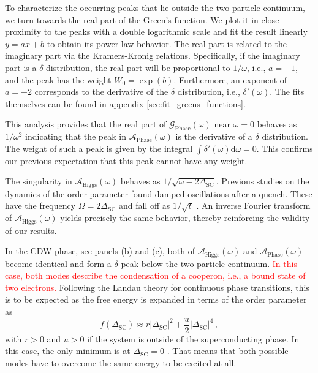 \documentclass[
    reprint, 
    aps,
    preprintnumbers,
    twocolumn,
    prb,
    superscriptaddress
]{revtex4-2}
\newcommand{\greens}[1]{\mathcal{G}_\text{#1} (\omega)}
\newcommand{\spectral}[1]{\mathcal{A}_\text{#1}  (\omega)}
\newcommand{\markEdited}{red}
\begin{document}
To characterize the occurring peaks that lie outside the two-particle continuum, we turn towards the real part of the Green's function.
We plot it in close proximity to the peaks with a double logarithmic scale and fit the result linearly $y = ax + b$ to obtain its power-law behavior.
The real part is related to the imaginary part via the Kramers-Kronig relations.
Specifically, if the imaginary part is a $\delta$ distribution, the real part will be proportional to $1/\omega$, i.e., $a=-1$, and the peak has the weight $W_0 = \exp(b)$.
Furthermore, an exponent of $a=-2$ corresponds to the derivative of the $\delta$ distribution, i.e., $\delta'(\omega)$.
The fits themselves can be found in appendix \ref{sec:fit_greens_functions}.

This analysis provides that the real part of $\greens{Phase}$ near $\omega=0$ behaves as $1/\omega^2$ indicating that the peak in $\spectral{Phase}$ is the derivative of a $\delta$ distribution.
The weight of such a peak is given by the integral $\int \delta'(\omega) \mathrm{d}\omega = 0$.
This confirms our previous expectation that this peak cannot have any weight.

The singularity in $\spectral{Higgs}$ behaves as $1/\sqrt{\omega - 2 \Delta_\text{SC}}$.
Previous studies on the dynamics of the order parameter found damped oscillations after a quench.
These have the frequency $\Omega = 2 \Delta_\text{SC}$ and fall off as $1/\sqrt{t}$ \cite{Volkov73,Kulik1981,Yuzbashyan06}.
An inverse Fourier transform of $\spectral{Higgs}$ yields precisely the same behavior, thereby reinforcing the validity of our results.

In the CDW phase, see panels (b) and (c), both of $\spectral{Higgs}$ and $\spectral{Phase}$ become identical and form a $\delta$ peak below the two-particle continuum.
\textcolor{\markEdited}{In this case, both modes describe the condensation of a cooperon, i.e., a bound state of two electrons.}
Following the Landau theory for continuous phase transitions, this is to be expected as the free energy is expanded in terms of the order parameter as
\begin{equation}
    f(\Delta_\text{SC}) \approx r |\Delta_\text{SC}|^2 + \frac{u}{2} |\Delta_\text{SC}|^4\,,
\end{equation}
with $r > 0$ and $u > 0$ if the system is outside of the superconducting phase. 
In this case, the only minimum is at $\Delta_\text{SC} = 0$ \cite{Coleman2015}. 
That means that both possible modes have to overcome the same energy to be excited at all. 
\end{document}
